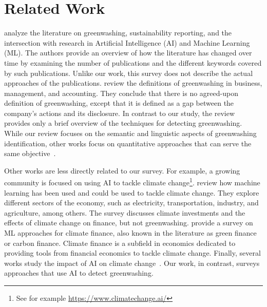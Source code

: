 \section{Related Work} 
\label{sec:related}

\citet{moodaley_greenwashing_2023} analyze the literature on greenwashing, sustainability reporting, and the intersection with research in Artificial Intelligence (AI) and Machine Learning (ML). The authors provide an overview of how the literature has changed over time by examining the number of publications and the different keywords covered by such publications. Unlike our work, this survey does not describe the actual approaches of the publications.
\citet{measuring_greenwashing} review the definitions of greenwashing in business, management, and accounting. They conclude that there is no agreed-upon definition of greenwashing, except that it is defined as a gap between the company's actions and its disclosure. In contrast to our study, the review provides only a brief overview of the techniques for detecting greenwashing.
While our review focuses on the semantic and linguistic aspects of greenwashing identification, other works focus on quantitative approaches that can serve the same objective~\cite{dao2024introduction}.

Other works are less directly related to our survey. For example, a growing community is focused on using AI to tackle climate change\footnote{See for example \url{https://www.climatechange.ai/}}. \citet{Rolnick_tackling_climate} review how machine learning has been used and could be used to tackle climate change. They explore different sectors of the economy, such as electricity, transportation, industry, and agriculture, among others. The survey discusses climate investments and the effects of climate change on finance, but not greenwashing. 
\citet{alonsoMachineLearningMethods2023} provide a survey on ML approaches for climate finance, also known in the literature as green finance or carbon finance. Climate finance is a subfield in economics dedicated to providing tools from financial economics to tackle climate change. Finally, several works study the impact of AI on climate change~\cite{hershcovich_towards_2022,kaack_aligning_2022,rohde_broadening_2023,verdecchia_systematic_2023}. Our work, in contrast, surveys approaches that use AI to detect greenwashing.


